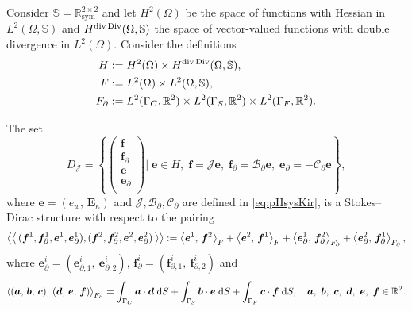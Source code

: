 \begin{conjecture}\label{conj:stdirKir}
	Consider $\mathbb{S} = \mathbb{R}^{2\times 2}_{\text{sym}}$ and
	let $H^{2}(\Omega)$ be the space of functions with Hessian in $L^2(\Omega, \mathbb{S})$ and $H^{\div\Div}  (\Omega, \mathbb{S})$ the space of vector-valued functions with double divergence in $L^2(\Omega)$. Consider the definitions
	\begin{align*}
	H &:=H^{2}(\Omega) \times H^{\div\Div}(\Omega, \mathbb{S}), \\
	F &:= L^2(\Omega) \times L^2(\Omega, \mathbb{S}), \\
	F_\partial &:= L^2(\Gamma_C, \mathbb{R}^2) \times L^2(\Gamma_S, \mathbb{R}^2) \times L^2(\Gamma_F, \mathbb{R}^2). 
	\end{align*}
	
	The set 
	\begin{equation}
	{D}_{\mathcal{J}} = \left\{
	\begin{pmatrix}
	\bm{f} \\ \bm{f}_\partial \\ \bm{e} \\ \bm{e}_\partial \\
	\end{pmatrix}
	\vert \;
	\bm{e} \in H, \; \bm{f} = \mathcal{J} \bm{e}, \;\bm{f}_\partial = \mathcal{B}_\partial \bm{e}, \; \bm{e}_\partial = -\mathcal{C}_\partial \bm{e}   \right\},
	\end{equation}
	where $\bm{e} = ({e}_w, \, \bm{E}_\kappa)$ and $\mathcal{J, B_\partial, C_\partial}$ are defined in \eqref{eq:pHsysKir}, is a Stokes–Dirac structure with respect to the pairing
	\begin{equation}\label{eq:bilinearKir}
	\bilprod{(\bm{f}^1, \bm{f}_{\partial}^1, \bm{e}^1, \bm{e}_{\partial}^1)}{(\bm{f}^2, \bm{f}_{\partial}^2, \bm{e}^2, \bm{e}_{\partial}^2)}  := \inner[F]{\bm{e}^1}{\bm{f}^2} + \inner[F]{\bm{e}^2}{\bm{f}^1} + \inner[F_\partial]{\bm{e}_{\partial}^1}{\bm{f}_{\partial}^2} + \inner[F_\partial]{\bm{e}_{\partial}^2}{\bm{f}_{\partial}^1},
	\end{equation}
	where $\bm{e}_{\partial}^i = (\bm{e}_{\partial, 1}^i, \ \bm{e}_{\partial, 2}^i), \, \bm{f}_{\partial}^i = (\bm{f}_{\partial, 1}^i, \ \bm{f}_{\partial, 2}^i)$ and
	\begin{equation*}
	\inner[F_\partial]{(\bm{a}, \, \bm{b}, \, \bm{c})}{(\bm{d}, \, \bm{e}, \, \bm{f})} = \int_{\Gamma_C} \bm{a} \cdot \bm{d} \d{S} + \int_{\Gamma_S} \bm{b} \cdot \bm{e} \d{S}  + \int_{\Gamma_F} \bm{c} \cdot \bm{f} \d{S}, \quad \bm{a},\ \bm{b},\ \bm{c},\ \bm{d},\ \bm{e},\ \bm{f} \in \mathbb{R}^2. 
	\end{equation*}
	

\end{conjecture}

